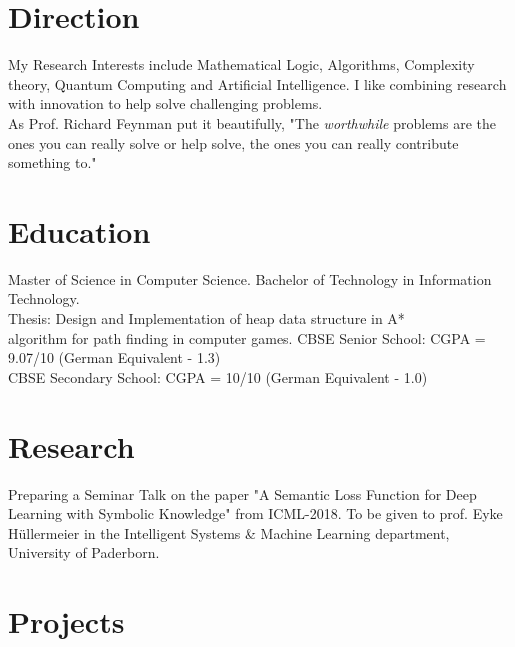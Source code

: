 \documentclass{my_cv}
\begin{document}


\section{\textcolor{BrickRed}{Dir}ection}
My Research Interests include Mathematical Logic, Algorithms, Complexity theory, Quantum Computing and Artificial Intelligence. I like combining research with innovation to help solve challenging problems.\\
As Prof. Richard Feynman put it beautifully, "The \emph{worthwhile} problems are the ones you can really solve or help solve, the ones you can really contribute something to."

\section{\textcolor{BrickRed}{Edu}cation}
Master of Science in Computer Science.
Bachelor of Technology in Information Technology.\\
Thesis: Design and Implementation of heap data structure in A*\\ algorithm for path finding in computer games.
CBSE Senior School: CGPA = 9.07/10 (German Equivalent - 1.3)\\
CBSE Secondary School: CGPA = 10/10 (German Equivalent - 1.0)

\section{\textcolor{BrickRed}{Res}earch}
Preparing a Seminar Talk on the paper "A Semantic Loss Function for Deep Learning with Symbolic Knowledge" from ICML-2018. To be given to prof. Eyke Hüllermeier in the Intelligent Systems \& Machine Learning department, University of Paderborn.

\section{\textcolor{BrickRed}{Pro}jects}
\end{document}
